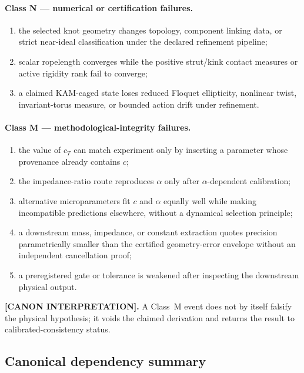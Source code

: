 \documentclass[11pt]{article}
\theoremstyle{definition}
\theoremstyle{plain}
\theoremstyle{remark}
\begin{document}
\paragraph{Class N --- numerical or certification failures.}
\begin{enumerate}
    \item the selected knot geometry changes topology, component linking data,
    or strict near-ideal classification under the declared refinement pipeline;
    \item scalar ropelength converges while the positive strut/kink contact
    measures or active rigidity rank fail to converge;
    \item a claimed KAM-caged state loses reduced Floquet ellipticity, nonlinear
    twist, invariant-torus measure, or bounded action drift under refinement.
\end{enumerate}

\paragraph{Class M --- methodological-integrity failures.}
\begin{enumerate}
    \item the value of $c_T$ can match experiment only by inserting a parameter
    whose provenance already contains $c$;
    \item the impedance-ratio route reproduces $\alpha$ only after
    $\alpha$-dependent calibration;
    \item alternative microparameters fit $c$ and $\alpha$ equally well while
    making incompatible predictions elsewhere, without a dynamical selection
    principle;
    \item a downstream mass, impedance, or constant extraction quotes precision
    parametrically smaller than the certified geometry-error envelope without an
    independent cancellation proof;
    \item a preregistered gate or tolerance is weakened after inspecting the
    downstream physical output.
\end{enumerate}

\textbf{[CANON INTERPRETATION].}
A Class~M event does not by itself falsify the physical hypothesis; it voids the
claimed derivation and returns the result to calibrated-consistency status.

\subsection{Canonical dependency summary}
\label{subsec:canonical_dependency_summary}
\end{document}
